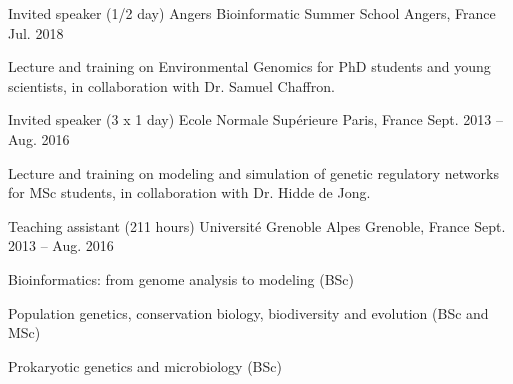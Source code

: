 
\begin{cventries}
  \cventry
    {Invited speaker (1/2 day)} %
    {Angers Bioinformatic Summer School} %
    {Angers, France} %
    {Jul. 2018} %
    {
	\begin{cvitems} %
		\item {Lecture and training on Environmental Genomics for PhD students and young scientists, in collaboration with Dr. Samuel Chaffron.}
	\end{cvitems}
    }
    
  \cventry
    {Invited speaker (3 x 1 day)} %
    {Ecole Normale Supérieure} %
    {Paris, France} %
    {Sept. 2013 -- Aug. 2016} %
    {
	\begin{cvitems} %
		\item {Lecture and training on modeling and simulation of genetic regulatory networks for MSc students, in collaboration with Dr. Hidde de Jong.}
	\end{cvitems}
    }
    
  \cventry
    {Teaching assistant (211 hours)} %
    {Université Grenoble Alpes} %
    {Grenoble, France} %
    {Sept. 2013 -- Aug. 2016} %
    {
	\begin{cvitems} %
		\item {Bioinformatics: from genome analysis to modeling (BSc)}
		\item {Population genetics, conservation biology, biodiversity and evolution (BSc and MSc)}
		\item {Prokaryotic genetics and microbiology (BSc)}
	\end{cvitems}
    }

\end{cventries}